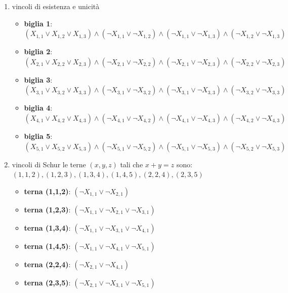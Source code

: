 \documentclass[10pt]{article}
\begin{document}
\begin{enumerate}
    \item vincoli di esistenza e unicità
\begin{itemize}
    \item \textbf{biglia 1}: $(X_{1,1} \lor X_{1,2} \lor X_{1,3}) \land (\neg X_{1,1} \lor \neg X_{1,2}) \land (\neg X_{1,1} \lor \neg X_{1,3}) \land (\neg X_{1,2} \lor \neg X_{1,3})$
    \item \textbf{biglia 2}: $(X_{2,1} \lor X_{2,2} \lor X_{2,3}) \land (\neg X_{2,1} \lor \neg X_{2,2}) \land (\neg X_{2,1} \lor \neg X_{2,3}) \land (\neg X_{2,2} \lor \neg X_{2,3})$
    \item \textbf{biglia 3}: $(X_{3,1} \lor X_{3,2} \lor X_{3,3}) \land (\neg X_{3,1} \lor \neg X_{3,2}) \land (\neg X_{3,1} \lor \neg X_{3,3}) \land (\neg X_{3,2} \lor \neg X_{3,3})$
    \item \textbf{biglia 4}: $(X_{4,1} \lor X_{4,2} \lor X_{4,3}) \land (\neg X_{4,1} \lor \neg X_{4,2}) \land (\neg X_{4,1} \lor \neg X_{4,3}) \land (\neg X_{4,2} \lor \neg X_{4,3})$
    \item \textbf{biglia 5}: $(X_{5,1} \lor X_{5,2} \lor X_{5,3}) \land (\neg X_{5,1} \lor \neg X_{5,2}) \land (\neg X_{5,1} \lor \neg X_{5,3}) \land (\neg X_{5,2} \lor \neg X_{5,3})$
\end{itemize}

    \item vincoli di Schur
        \subitem le terne $(x, y, z)$ tali che $x+y=z$ sono: 
        \subitem $(1,1,2), (1,2,3), (1,3,4), (1,4,5), (2,2,4), (2,3,5)$

    \begin{itemize}
    \item \textbf{terna (1,1,2)}: $(\neg X_{1,1} \lor \neg X_{2,1})$
    \item \textbf{terna (1,2,3)}: $(\neg X_{1,1} \lor \neg X_{2,1} \lor \neg X_{3,1})$
    \item \textbf{terna (1,3,4)}: $(\neg X_{1,1} \lor \neg X_{3,1} \lor \neg X_{4,1})$
    \item \textbf{terna (1,4,5)}: $(\neg X_{1,1} \lor \neg X_{4,1} \lor \neg X_{5,1})$
    \item \textbf{terna (2,2,4)}: $(\neg X_{2,1} \lor \neg X_{4,1})$
    \item \textbf{terna (2,3,5)}: $(\neg X_{2,1} \lor \neg X_{3,1} \lor \neg X_{5,1})$
\end{itemize}


\end{enumerate}
\end{document}
